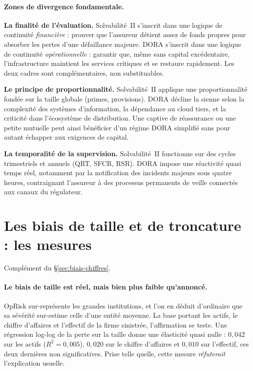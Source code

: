 \paragraph{Zones de divergence fondamentale.}
\textbf{La finalité de l'évaluation.} Solvabilité~II s'inscrit dans une logique de
continuité \emph{financière} : prouver que l'assureur détient assez de fonds propres pour
absorber les pertes d'une défaillance majeure. DORA s'inscrit dans une logique de
continuité \emph{opérationnelle} : garantir que, même sans capital excédentaire,
l'infrastructure maintient les services critiques et se restaure rapidement. Les deux
cadres sont complémentaires, non substituables.

\textbf{Le principe de proportionnalité.} Solvabilité~II applique une proportionnalité
fondée sur la taille globale (primes, provisions). DORA décline la sienne selon la
complexité des systèmes d'information, la dépendance au cloud tiers, et la criticité dans
l'écosystème de distribution. Une captive de réassurance ou une petite mutuelle peut ainsi
bénéficier d'un régime DORA simplifié sans pour autant échapper aux exigences de capital.

\textbf{La temporalité de la supervision.} Solvabilité~II fonctionne sur des cycles
trimestriels et annuels (QRT, SFCR, RSR). DORA impose une réactivité quasi temps réel,
notamment par la notification des incidents majeurs sous quatre heures, contraignant
l'assureur à des processus permanents de veille connectés aux canaux du régulateur.

\section{Les biais de taille et de troncature : les mesures}
\label{sec:ann-biais-chiffres}


Complément du \S\ref{sec:biais-chiffres}.

\paragraph{Le biais de taille est réel, mais bien plus faible qu'annoncé.} OpRisk
sur-représente les grandes institutions, et l'on en déduit d'ordinaire que sa sévérité
sur-estime celle d'une entité moyenne. La base portant les actifs, le chiffre d'affaires et
l'effectif de la firme sinistrée, l'affirmation se teste. Une régression log-log de la perte
sur la taille donne une élasticité quasi nulle : $0{,}042$ sur les actifs
($R^2=0{,}005$), $0{,}020$ sur le chiffre d'affaires et $0{,}010$ sur l'effectif, ces deux
dernières non significatives. Prise telle quelle, cette mesure \emph{réfuterait} l'explication
usuelle.

